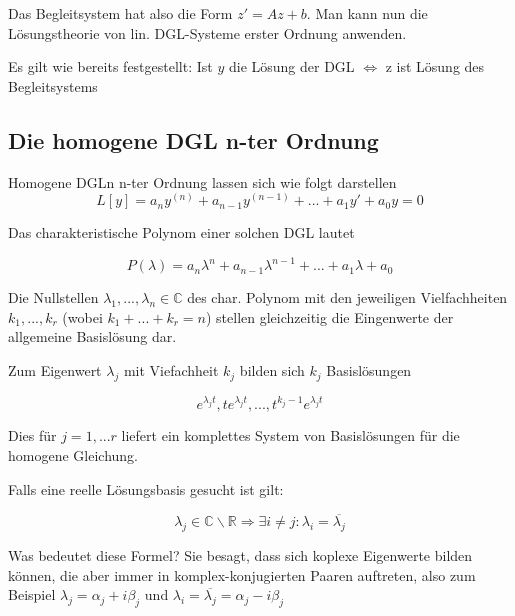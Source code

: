 \documentclass[10pt,a4paper]{article}
\begin{document}
Das Begleitsystem hat also die Form $z' = Az + b$. Man kann nun die Lösungstheorie von lin. DGL-Systeme erster Ordnung anwenden.

Es gilt wie bereits festgestellt: Ist $y$ die Lösung der DGL $\Leftrightarrow$ z ist Lösung des Begleitsystems

\subsection{Die homogene DGL n-ter Ordnung}

Homogene DGLn n-ter Ordnung lassen sich wie folgt darstellen
\begin{equation}
L[y]=a_n y^{(n)}+ a_{n-1} y^{(n-1)} + ... + a_1 y' + a_0 y = 0
\end{equation}


Das charakteristische Polynom einer solchen DGL lautet

\begin{equation}
P(\lambda)= a_n \lambda^{n}+ a_{n-1} \lambda^{n-1} + ... + a_1 \lambda + a_0
\end{equation}

Die Nullstellen $\lambda_1,..., \lambda_n \in \mathbb{C}$ des char. Polynom mit den jeweiligen  Vielfachheiten $k_1,...,k_r$ (wobei $ k_1+...+k_r = n$) stellen gleichzeitig die Eingenwerte der allgemeine Basislösung dar.

Zum Eigenwert $\lambda_j$ mit Viefachheit $k_j$ bilden sich $k_j$ Basislösungen

\begin{equation}
e^{\lambda_j t}, t e^{\lambda_j t}, ... , t^{k_j -1} e^{\lambda_j t}
\end{equation}

Dies für $j=1,... r$ liefert ein komplettes System von Basislösungen für die homogene Gleichung.
 
Falls eine reelle Lösungsbasis gesucht ist gilt:

\begin{equation}
\lambda_j \in \mathbb{C}  \backslash \mathbb{R} \Rightarrow \exists i \not= j: \lambda_i = \overline{\lambda_j}
\end{equation}

Was bedeutet diese Formel? Sie besagt, dass sich koplexe Eigenwerte bilden können, die aber immer in komplex-konjugierten Paaren auftreten, also zum Beispiel  $\lambda_j=\alpha_j +i \beta_j$ und $\lambda_i = \overline{\lambda_j}=\alpha_j -i \beta_j$

\end{document}
